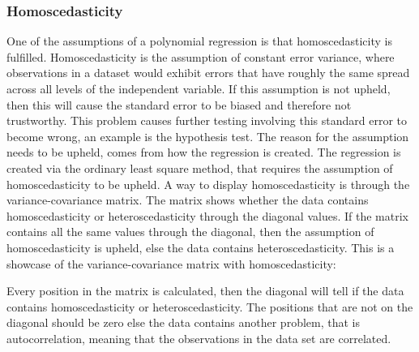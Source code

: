 \subsubsection{Homoscedasticity}
One of the assumptions of a polynomial regression is that homoscedasticity is fulfilled. Homoscedasticity is the assumption of constant error variance, where observations in a dataset would exhibit errors that have roughly the same spread across all levels of the independent variable.
\newline
If this assumption is not upheld, then this will cause the standard error to be biased and therefore not trustworthy. This problem causes further testing involving this standard error to become wrong, an example is the hypothesis test.
\newline
The reason for the assumption needs to be upheld, comes from how the regression is created. The regression is created via the ordinary least square method, that requires the assumption of homoscedasticity to be upheld.
\newline
A way to display homoscedasticity is through the variance-covariance matrix. The matrix shows whether the data contains homoscedasticity or heteroscedasticity through the diagonal values. If the matrix contains all the same values through the diagonal, then the assumption of homoscedasticity is upheld, else the data contains heteroscedasticity. This is a showcase of the variance-covariance matrix with homoscedasticity:


	
Every position in the matrix is calculated, then the diagonal will tell if the data contains homoscedasticity or heteroscedasticity. The positions that are not on the diagonal should be zero else the data contains another problem, that is autocorrelation, meaning that the observations in the data set are correlated.

